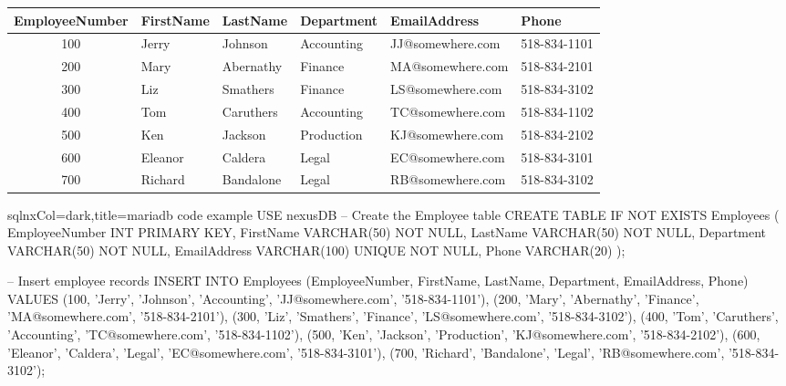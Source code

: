\begin{NxLightBox}[title={EXAMPLE OF AN EMPLOYEE RELATION}]
		\begin{tabularx}{\textwidth}{|c|X|X|X|X|l|}
				\hline
				EmployeeNumber & FirstName & LastName & Department & EmailAddress & Phone \\
				\hline
				100 & Jerry		& Johnson		& Accounting & JJ@somewhere.com & 518-834-1101 \\
				200 & Mary		& Abernathy & Finance		 & MA@somewhere.com & 518-834-2101 \\
				300 & Liz			& Smathers	& Finance		 & LS@somewhere.com & 518-834-3102 \\
				400 & Tom			& Caruthers & Accounting & TC@somewhere.com & 518-834-1102 \\
				500 & Ken			& Jackson		& Production & KJ@somewhere.com & 518-834-2102 \\
				600 & Eleanor & Caldera		& Legal			 & EC@somewhere.com & 518-834-3101 \\
				700 & Richard & Bandalone & Legal			 & RB@somewhere.com & 518-834-3102 \\
				\hline
		\end{tabularx}
\end{NxLightBox}

\begin{NxCodeBox}{sql}{nxCol=dark,title={mariadb code example}}
USE nexusDB
-- Create the Employee table
CREATE TABLE IF NOT EXISTS Employees (
		EmployeeNumber INT PRIMARY KEY,
		FirstName			 VARCHAR(50) NOT NULL,
		LastName			 VARCHAR(50) NOT NULL,
		Department		 VARCHAR(50) NOT NULL,
		EmailAddress	 VARCHAR(100) UNIQUE NOT NULL,
		Phone					 VARCHAR(20)
);

-- Insert employee records
INSERT INTO Employees (EmployeeNumber, FirstName, LastName, Department, EmailAddress, Phone) VALUES
(100, 'Jerry',	 'Johnson',		'Accounting', 'JJ@somewhere.com', '518-834-1101'),
(200, 'Mary',		 'Abernathy', 'Finance',		'MA@somewhere.com', '518-834-2101'),
(300, 'Liz',		 'Smathers',	'Finance',		'LS@somewhere.com', '518-834-3102'),
(400, 'Tom',		 'Caruthers', 'Accounting', 'TC@somewhere.com', '518-834-1102'),
(500, 'Ken',		 'Jackson',		'Production', 'KJ@somewhere.com', '518-834-2102'),
(600, 'Eleanor', 'Caldera',		'Legal',			'EC@somewhere.com', '518-834-3101'),
(700, 'Richard', 'Bandalone', 'Legal',			'RB@somewhere.com', '518-834-3102');
\end{NxCodeBox}

